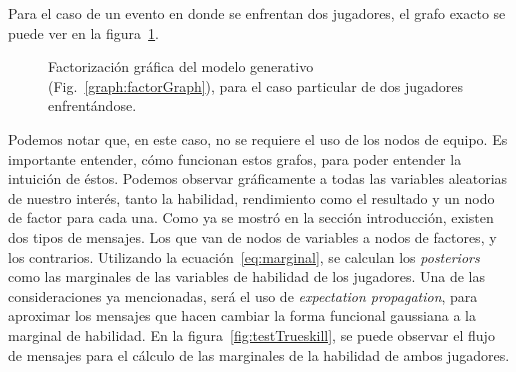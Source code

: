 \documentclass[11pt,twoside,spanish]{report} %
\begin{document}
Para el caso de un evento en donde se enfrentan dos jugadores, el grafo exacto se puede ver en la figura~\ref{fig:ejfig1vs1}.

\begin{figure}[H]
	\centering
\caption{ Factorizaci\'on gráfica del modelo generativo (Fig.~\ref{graph:factorGraph}), para el caso particular de dos jugadores enfrent\'andose.}
\label{fig:ejfig1vs1}
\end{figure}


Podemos notar que, en este caso, no se requiere el uso de los nodos de equipo.
Es importante entender, c\'omo funcionan estos grafos, para poder entender la intuici\'on de \'estos.
Podemos observar gr\'aficamente a todas las variables aleatorias de nuestro inter\'es, tanto la habilidad, rendimiento como el resultado y un nodo de factor para cada una.
Como ya se mostr\'o en la secci\'on introducci\'on, existen dos tipos de mensajes.
Los que van de nodos de variables a nodos de factores, y los contrarios.
Utilizando la ecuaci\'on~\ref{eq:marginal}, se calculan los \textit{posteriors} como las marginales de las variables de habilidad de los jugadores. 
Una de las consideraciones ya mencionadas, ser\'a el uso de \textit{expectation propagation}, para aproximar los mensajes que hacen cambiar la forma funcional gaussiana a la marginal de habilidad.
En la figura~\ref{fig:testTrueskill}, se puede observar el flujo de mensajes para el c\'alculo de las marginales de la habilidad de ambos jugadores. 
\end{document}
